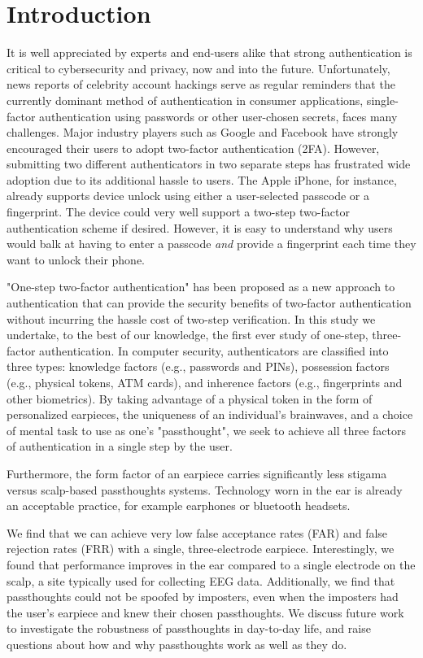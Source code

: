 \documentclass{sigchi}
\begin{document}
\section{Introduction}

It is well appreciated by experts and end-users alike that strong authentication is
critical to cybersecurity and privacy, now and into the future. Unfortunately,
news reports of celebrity account hackings serve as regular reminders that
the currently dominant method of authentication in consumer applications, 
single-factor authentication using passwords or other user-chosen secrets, 
faces many challenges. Major industry players such as Google and
Facebook have strongly encouraged their users to adopt two-factor
authentication (2FA). However, submitting two different 
authenticators in two separate steps has frustrated wide adoption
due to its additional hassle to users. The Apple iPhone, for instance,
already supports device unlock using either a user-selected passcode or a fingerprint. The
device could very well support a two-step two-factor authentication scheme if
desired. However, it is easy to understand why users would balk at having to
enter a passcode \emph{and} provide a fingerprint each time they want to unlock their phone.

"One-step two-factor authentication" has been proposed as a new approach
to authentication that can provide the security benefits of two-factor authentication without incurring the hassle cost of two-step verification.
In this study we undertake, to the best of our knowledge, the first
ever study of one-step, three-factor authentication. In computer security,
authenticators are classified into three types: knowledge factors (e.g., passwords
and PINs), possession factors (e.g., physical tokens, ATM cards), and inherence
factors (e.g., fingerprints and other biometrics). By taking advantage of a physical token 
in the form of personalized earpieces, the uniqueness of an individual's brainwaves, and
a choice of mental task to use as one's "passthought", we seek to achieve all three factors 
of authentication in a single step by the user.

Furthermore, the form factor of an earpiece carries significantly less stigama versus scalp-based passthoughts systems. Technology worn in the ear is already an acceptable practice, for example earphones or bluetooth headsets.

We find that we can achieve very low false acceptance rates (FAR) and false rejection rates (FRR) with a single, 
three-electrode earpiece. Interestingly, we found that performance improves in the ear compared to a single electrode on the scalp, a site typically used for collecting EEG data. Additionally, we find that passthoughts could not be spoofed by imposters, even when the imposters had the user's earpiece and knew their chosen passthoughts. We discuss future work to investigate the robustness of passthoughts in day-to-day life, and raise questions about how and why passthoughts work as well as they do.
\end{document}
